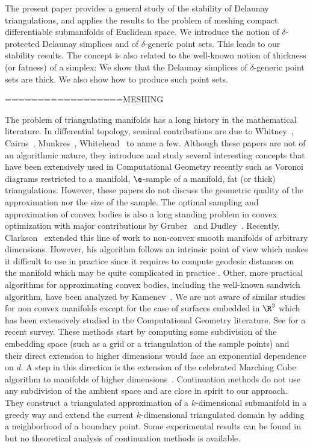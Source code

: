 The present paper provides a general study of the stability of
Delaunay triangulations, and applies the results to the problem of
meshing compact differentiable submanifolds of Euclidean space. We
introduce the notion of $\delta$-protected Delaunay simplices and of
$\delta$-generic point sets.  This leads to our stability results. The
concept is also related to the well-known notion of thickness (or
fatness) of a simplex: We show that the Delaunay simplices of
$\delta$-generic point sets are thick.  We also show how to produce
such point sets.



==================MESHING

The problem of triangulating manifolds has a long history in the
mathematical literature. In differential topology, seminal
contributions are due to Whitney~\cite{whitney}, Cairns~\cite{cairns},
Munkres~\cite{munkres}, Whitehead~\cite{whitehead} to name a
few. Although these papers are not of an algorithmic nature, they
introduce and study several interesting concepts that have been
extensively used in Computational Geometry recently such as Voronoi
diagrams restricted to a manifold, $\e$-sample of a manifold, fat (or
thick) triangulations. However, these papers do not discuss the
geometric quality of the approximation nor the size of the sample. The
optimal sampling and approximation of convex bodies is also a long
standing problem in convex optimization with major contributions by
Gruber~\cite{gruber1,gruber2} and Dudley~\cite{dudley}. Recently,
Clarkson~\cite{clarkson} extended this line of work to non-convex
smooth manifolds of arbitrary dimensions. 
However, his algorithm follows an intrinsic point of
view which makes it difficult to use in practice since it requires to
compute geodesic distances on the manifold which may be quite
complicated in practice \cite{pc-gcsrp-05}. Other, more practical
algorithms for approximating convex bodies, including the well-known
sandwich algorithm, have been analyzed by
Kamenev~\cite{convex-bodies}. We are not aware of similar studies for
non convex manifolds except for the case of surfaces embedded in $\R
^3$ which has been extensively studied in the Computational Geometry
literature.  See \cite{ECGBook} for a recent survey.  These methods
start by computing some subdivision of the embedding space (such as a
grid or a triangulation of the sample points)  and their
direct extension to higher dimensions would face an exponential
dependence on $d$. A step in this direction is the extension of the
celebrated Marching Cube algorithm to manifolds of higher
dimensions~\cite{marching-cube1,isosurface}.  Continuation methods do
not use any subdivision of the ambient space and are close in spirit
to our approach. They construct a triangulated approximation of a
$k$-dimensional submanifold in a greedy way and extend the current
$k$-dimensional triangulated domain by adding a neighborhood of a
boundary point. Some experimental results can be found in \cite{henderson} but
no theoretical analysis of continuation methods is available.

